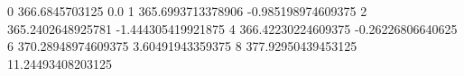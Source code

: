 0 366.6845703125 0.0
1 365.6993713378906 -0.985198974609375
2 365.2402648925781 -1.444305419921875
4 366.42230224609375 -0.26226806640625
6 370.28948974609375 3.60491943359375
8 377.92950439453125 11.24493408203125
